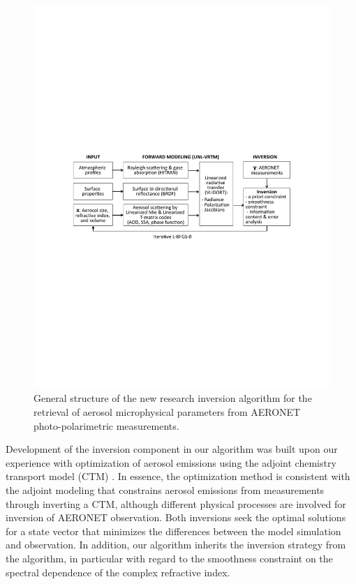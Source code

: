 \begin{figure}[t]
  \centering
  \includegraphics[width={\textwidth}]{figures/algorithm.pdf}
  \caption{General structure of the new research inversion algorithm for
the retrieval of aerosol microphysical parameters from AERONET
photo-polarimetric measurements.}
  \label{fig:alg}
\end{figure}

Development of the inversion component in our algorithm was built upon
our experience with optimization of aerosol emissions using the adjoint
chemistry transport model (CTM) \citep{Wang12, Xu13}. In
essence, the optimization method is consistent with the adjoint modeling
that constrains aerosol emissions from measurements through inverting a
CTM, although different physical processes are involved for inversion of
AERONET observation. Both inversions seek the optimal solutions for a
state vector that minimizes the differences between the model simulation
and observation. In addition, our algorithm inherits the inversion
strategy from the \Dub algorithm, in particular with regard to
the smoothness constraint on the spectral dependence of the complex
refractive index.

